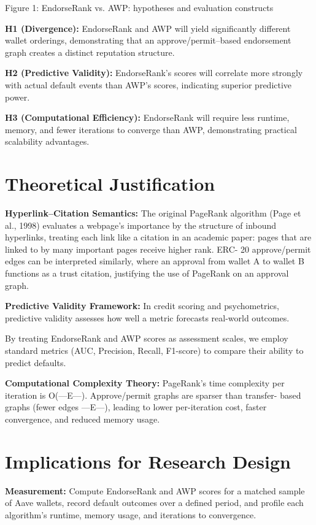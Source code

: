 \documentclass[
]{article}
\begin{document}
Figure 1: EndorseRank vs. AWP: hypotheses and evaluation constructs

\textbf{H1 (Divergence):} EndorseRank and AWP will yield significantly different wallet orderings, demonstrating that an approve/permit--based endorsement graph creates a distinct reputation structure.

\textbf{H2 (Predictive Validity):} EndorseRank's scores will correlate more strongly with actual default events than AWP's scores, indicating superior predictive power.

\textbf{H3 (Computational Efficiency):} EndorseRank will require less runtime, memory, and fewer iterations to converge than AWP, demonstrating practical scalability advantages.

\section{Theoretical Justification}\label{theoretical-justification}

\textbf{Hyperlink--Citation Semantics:} The original PageRank algorithm (Page et al., 1998) evaluates a webpage's importance by the structure of inbound hyperlinks, treating each link like a citation in an academic paper: pages that are linked to by many important pages receive higher rank. ERC- 20 approve/permit edges can be interpreted similarly, where an approval from wallet A to wallet B functions as a trust citation, justifying the use of PageRank on an approval graph.

\textbf{Predictive Validity Framework:} In credit scoring and psychometrics, predictive validity assesses how well a metric forecasts real-world outcomes.

By treating EndorseRank and AWP scores as assessment scales, we employ standard metrics (AUC, Precision, Recall, F1-score) to compare their ability to predict defaults.

\textbf{Computational Complexity Theory:} PageRank's time complexity per iteration is O(---E---). Approve/permit graphs are sparser than transfer- based graphs (fewer edges ---E---), leading to lower per-iteration cost, faster convergence, and reduced memory usage.

\section{Implications for Research Design}\label{implications-for-research-design}

\textbf{Measurement:} Compute EndorseRank and AWP scores for a matched sample of Aave wallets, record default outcomes over a defined period, and profile each algorithm's runtime, memory usage, and iterations to convergence.
\end{document}
